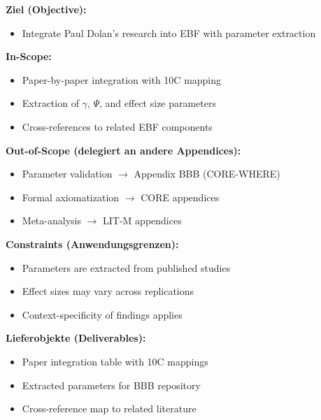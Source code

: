 
\begin{tcolorbox}[
    colback=orange!5!white,
    colframe=orange!75!black,
    title={\textbf{Appendix Scope: Ziel / In-Scope / Out-of-Scope / Constraints}},
    fonttitle=\bfseries
]

\textbf{Ziel (Objective):}
\begin{itemize}[nosep]
    \item Integrate Paul Dolan's research into EBF with parameter extraction
\end{itemize}

\textbf{In-Scope:}
\begin{itemize}[nosep]
    \item Paper-by-paper integration with 10C mapping
    \item Extraction of $\gamma$, $\Psi$, and effect size parameters
    \item Cross-references to related EBF components
\end{itemize}

\textbf{Out-of-Scope (delegiert an andere Appendices):}
\begin{itemize}[nosep]
    \item Parameter validation $\rightarrow$ Appendix BBB (CORE-WHERE)
    \item Formal axiomatization $\rightarrow$ CORE appendices
    \item Meta-analysis $\rightarrow$ LIT-M appendices
\end{itemize}

\textbf{Constraints (Anwendungsgrenzen):}
\begin{itemize}[nosep]
    \item Parameters are extracted from published studies
    \item Effect sizes may vary across replications
    \item Context-specificity of findings applies
\end{itemize}

\textbf{Lieferobjekte (Deliverables):}
\begin{itemize}[nosep]
    \item Paper integration table with 10C mappings
    \item Extracted parameters for BBB repository
    \item Cross-reference map to related literature
\end{itemize}

\end{tcolorbox}

